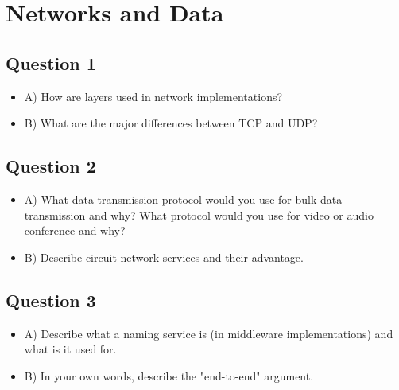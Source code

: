 \documentclass[oneside]{article}
\begin{document}
\newpage

\section*{Networks and Data}

\subsection*{Question 1}

\begin{itemize}

\item A) How are layers used in network implementations?

\vskip 8cm

\item B) What are the major differences between TCP
and UDP?

\end{itemize}

\newpage

\subsection*{Question 2}

\begin{itemize}

\item A) What data transmission protocol would you use
for bulk data transmission and why? 
What protocol would you use for video or audio conference and why?

\vskip 8cm

\item B) Describe circuit network services and their advantage.

\end{itemize}

\newpage

\subsection*{Question 3}

\begin{itemize}

\item A) Describe what a naming service is (in middleware
implementations) and what is it used for.

\vskip 8cm

\item B) In your own words, describe the "end-to-end" argument.

\end{itemize}
\end{document}
